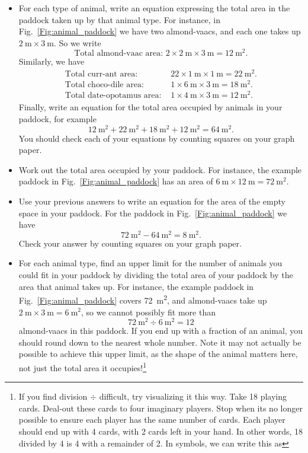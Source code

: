 \documentclass{article}
\begin{document}
\begin{itemize}
\item
For each type of animal, write an equation expressing the total area in the paddock taken up by that animal type. For instance, in Fig.~\ref{Fig:animal_paddock} we have two almond-vaacs, and each one takes up $\SI{2}{\meter}\times \SI{3}{\meter}$. So we write
$$
\text{Total almond-vaac area: } 2\times \SI{2}{\meter}\times \SI{3}{\meter} = \SI{12}{\meter \squared}.
$$
Similarly, we have
\begin{align}
\text{Total curr-ant area: } & 22\times \SI{1}{\meter}\times \SI{1}{\meter} = \SI{22}{\meter\squared}. \\
\text{Total choco-dile area: } & 1\times \SI{6}{\meter}\times \SI{3}{\meter} = \SI{18}{\meter\squared}. \\
\text{Total date-opotamus area: } & 1\times \SI{4}{\meter}\times \SI{3}{\meter} = \SI{12}{\meter\squared}.
\end{align}
Finally, write an equation for the total area occupied by animals in your paddock, for example
$$
\SI{12}{\meter\squared} + \SI{22}{\meter\squared} + \SI{18}{\meter\squared} + \SI{12}{\meter\squared} = \SI{64}{\meter\squared}.
$$
You should check each of your equations by counting squares on your graph paper.
\item
Work out the total area occupied by your paddock. For instance, the example paddock in Fig.~\ref{Fig:animal_paddock} has an area of $\SI{6}{\meter} \times \SI{12}{\meter} = \SI{72}{\meter\squared}$.
\item
Use your previous answers to write an equation for the area of the empty space in your paddock. For the paddock in Fig.~\ref{Fig:animal_paddock} we have
$$\SI{72}{\meter\squared} - \SI{64}{\meter\squared} = \SI{8}{\meter\squared}.$$
Check your answer by counting squares on your graph paper. 
\item
For each animal type, find an upper limit for the number of animals you could fit in your paddock by dividing the total area of your paddock by the area that animal takes up. For instance, the example paddock in Fig.~\ref{Fig:animal_paddock} covers \SI{72}{\meter\squared}, and almond-vaacs take up $\SI{2}{\meter}\times \SI{3}{\meter}=\SI{6}{\meter\squared}$, so we cannot possibly fit more than
\begin{equation*}
\SI{72}{\meter\squared} \div \SI{6}{\meter\squared} = 12
\end{equation*}
almond-vaacs in this paddock. If you end up with a fraction of an animal, you should round down to the nearest whole number. Note it may not actually be possible to achieve this upper limit, as the shape of the animal matters here, not just the total area it occupies!\footnote{If you find division $\div$ difficult, try visualizing it this way. Take 18 playing cards. Deal-out these cards to four imaginary players. Stop when its no longer possible to ensure each player has the same number of cards. Each player should end up with 4 cards, with 2 cards left in your hand. In other words, 18 divided by 4 is 4 with a remainder of 2. In symbols, we can write this as
}
\end{itemize}
\end{document}
